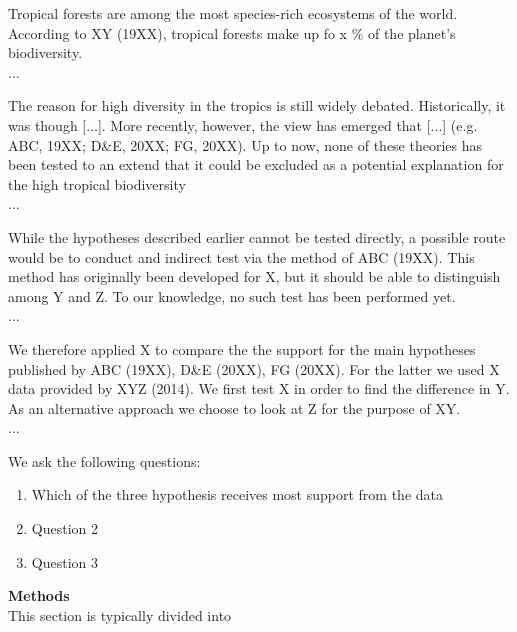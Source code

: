 \documentclass{tufte-book}
\begin{document}
Tropical forests are among the most species-rich ecosystems of the world. According to XY (19XX), tropical forests make up fo x \% of the planet's biodiversity.\\
...

The reason for high diversity in the tropics is still widely debated. Historically, it was though [...]. More recently, however, the view has emerged that [...] (e.g. ABC, 19XX; D\&E, 20XX; FG, 20XX). Up to now, none of these theories has been tested to an extend that it could be excluded as a potential explanation for the high tropical biodiversity\\
...

While the hypotheses described earlier cannot be tested directly, a possible route would be to conduct and indirect test via the method of ABC (19XX). This method has originally been developed for X, but it should be able to distinguish among Y and Z. To our knowledge, no such test has been performed yet.
\\
...

We therefore applied X to compare the the support for the main hypotheses published by ABC (19XX), D\&E (20XX), FG (20XX). For the latter we used X data provided by XYZ (2014). We first test X in order to find the difference in Y. As an alternative approach we choose to look at Z for the purpose of XY.\\
...

We ask the following questions:


\begin{enumerate}
\item Which of the three hypothesis receives most support from the data
\item Question 2
\item Question 3
\end{enumerate}

\noindent\textbf{Methods}\\[0.3cm]

This section is typically divided into
\end{document}
